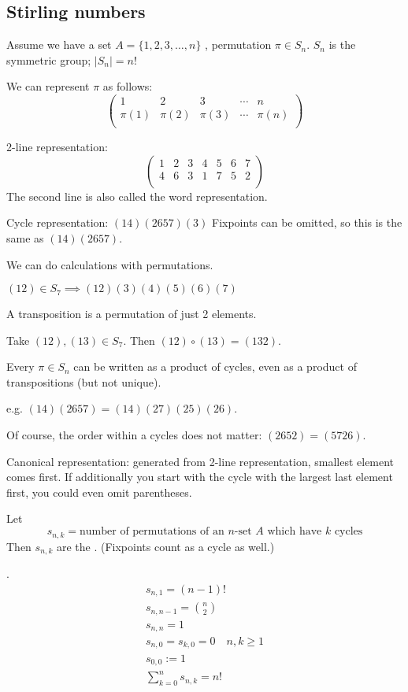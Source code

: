 \subsection{Stirling numbers}
Assume we have a set $A = \{1,2,3, \ldots ,n\}$
, permutation $\pi\in S_n$.
$S_n$ is the symmetric group; $|S_n| = n!$

We can represent $\pi$ as follows:
\[
  \begin{pmatrix}
    1&2&3&\cdots&n \\
    \pi(1)&\pi(2)&\pi(3)&\cdots&\pi(n) \\
  \end{pmatrix}
\]

2-line representation:
\[
  \begin{pmatrix}
    1&2&3&4&5&6&7 \\
    4&6&3&1&7&5&2 \\
  \end{pmatrix}
\]
The second line is also called the word representation.

Cycle representation:
$(1 4) (2 6 5 7) (3)$
Fixpoints can be omitted, so this is the same as $(14)(2657)$.

We can do calculations with permutations.

$(12)\in S_7 \implies (12)(3)(4)(5)(6)(7)$

A transposition is a permutation of just 2 elements.

Take $(12),(13)\in S_7$. Then $(12)\circ (13) = (132)$.

Every $\pi\in S_n$ can be written as a product of cycles, even as a product of transpositions (but not unique).

e.g. $(14)(2657) = (14)(27)(25)(26)$.

Of course, the order within a cycles does not matter:
$(2652)=(5726)$.

Canonical representation: generated from 2-line representation, smallest element comes first.
If additionally you start with the cycle with the largest last element first, you could even omit parentheses.

\begin{definition}
Let
\[
  s_{n,k} = \text{number of permutations of an $n$-set $A$ which have $k$ cycles}
\]
Then $s_{n,k}$ are the .
(Fixpoints count as a cycle as well.)
\end{definition}

\Remark.
\begin{gather*}
  s_{n,1} = (n-1)! \\
  s_{n,n-1} = {n\choose 2} \\
  s_{n,n} = 1 \\
  s_{n,0} = s_{k,0} = 0 \quad n,k ≥ 1 \\
  s_{0,0} := 1 \\
  \sum_{k=0}^{n} s_{n,k} = n! 
\end{gather*}

